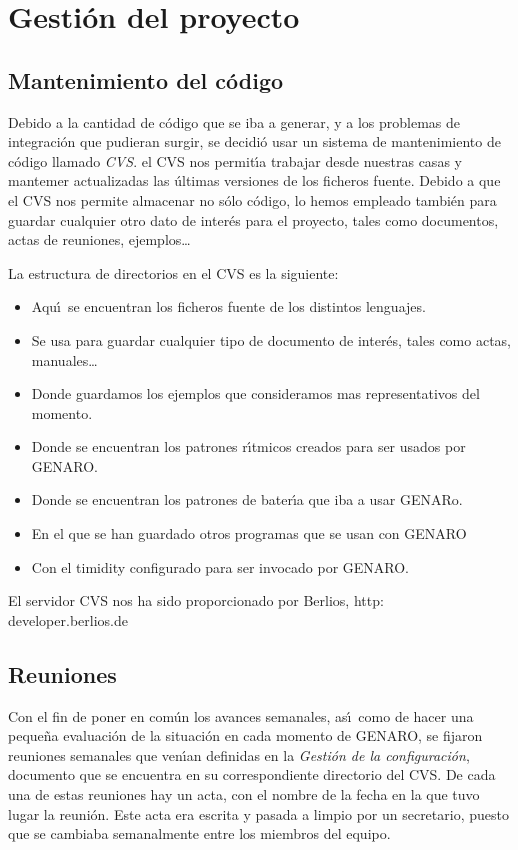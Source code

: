 \chapter{Gesti\'on del proyecto}
\section{Mantenimiento del c\'odigo}

Debido a la cantidad de c\'odigo que se iba a generar, y a los problemas de integraci\'on que pudieran surgir, se decidi\'o usar un sistema de mantenimiento de c\'odigo llamado \emph{CVS}. el CVS nos permit\'\i a trabajar desde nuestras casas y mantemer actualizadas las \'ultimas versiones de los ficheros fuente. Debido a que el CVS nos permite almacenar no s\'olo c\'odigo, lo hemos empleado tambi\'en para guardar cualquier otro dato de inter\'es para el proyecto, tales como documentos, actas de reuniones, ejemplos\dots

La estructura de directorios en el CVS es la siguiente:
\begin {itemize}
\item [Codigo] Aqu\'\i ~se encuentran los ficheros fuente de los distintos lenguajes.
\item [Documentos] Se usa para guardar cualquier tipo de documento de inter\'es, tales como actas, manuales\dots
\item [Ejemplos] Donde guardamos los ejemplos que consideramos mas representativos del momento.
\item [PatronesRitmicos] Donde se encuentran los patrones r\'\i tmicos creados para ser usados por GENARO.
\item [PatronesBateria] Donde se encuentran los patrones de bater\'\i a que iba a usar GENARo.
\item [ProgramasAux] En el que se han guardado otros programas que se usan con GENARO
\item [Timidity] Con el timidity configurado para ser invocado por GENARO.
\end {itemize}

El servidor CVS nos ha sido proporcionado por Berlios, http:\\developer.berlios.de

\section{Reuniones}

Con el fin de poner en com\'un los avances semanales, as\'\i ~como de hacer una peque\~na evaluaci\'on de la situaci\'on en cada momento de GENARO, se fijaron reuniones semanales que ven\'\i an definidas en la \emph{Gesti\'on de la configuraci\'on}, documento que se encuentra en su correspondiente directorio del CVS. De cada una de estas reuniones hay un acta, con el nombre de la fecha en la que tuvo lugar la reuni\'on. Este acta era escrita y pasada a limpio por un secretario, puesto que se cambiaba semanalmente entre los miembros del equipo.

